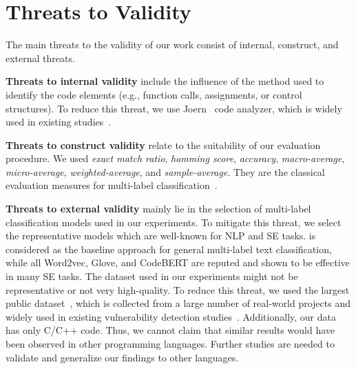 \section{Threats to Validity}
\label{sec:threats}



The main threats to the validity of our work consist of internal, construct, and external threats.

\textbf{Threats to internal validity} include the influence of the method used to identify the code elements (e.g., function calls, assignments, or control structures). To reduce this threat, we use Joern~\cite{joern} code analyzer, which is widely used in existing studies~\cite{velvet,vuldeeppeaker,ivdetect,linevd}. 

\textbf{Threats to construct validity} relate to the suitability of our evaluation procedure. We used \textit{exact match ratio}, \textit{hamming score}, \textit{accuracy}, \textit{macro-average}, \textit{micro-average}, \textit{weighted-average}, and \textit{sample-average}. They are the classical evaluation measures for multi-label classification~\cite{multilabel_cls}. 
%

\textbf{Threats to external validity} mainly lie in the selection of multi-label classification models used in our experiments. To mitigate this threat, we select the representative models which are well-known for NLP and SE tasks. \base is considered as the baseline approach for general multi-label text classification, while all Word2vec, Glove, and CodeBERT are reputed and shown to be effective in many SE tasks. The dataset used in our experiments might not be representative or not very high-quality. To reduce this threat, we used the largest public dataset~\cite{bigvul}, which is collected from a large number of real-world projects and widely used in existing vulnerability detection studies~\cite{linevd, linevul, ivdetect}. Additionally, our data has only C/C++ code. Thus, we cannot claim that similar results would have been observed in other programming languages. Further studies are needed to validate and generalize our findings to other languages. 

